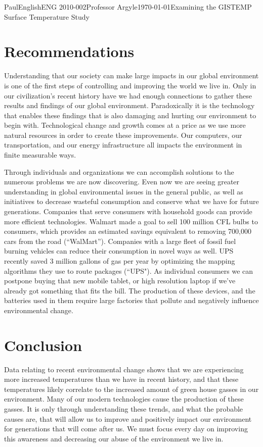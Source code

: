 \documentclass[12pt,letterpaper]{article}
\begin{document}
\begin{mla}{Paul}{English}{ENG 2010-002}{Professor Argyle}{\today}{Examining the GISTEMP Surface Temperature Study}
\section{Recommendations}

Understanding that our society can make large impacts in our global environment is one of the first steps of controlling and improving the world we live in. Only in our civilization's recent history have we had enough connections to gather these results and findings of our global environment. Paradoxically it is the technology that enables these findings that is also damaging and hurting our environment to begin with. Technological change and growth comes at a price as we use more natural resources in order to create these improvements. Our computers, our transportation, and our energy infrastructure all impacts the environment in finite measurable ways.

Through individuals and organizations we can accomplish solutions to the numerous problems we are now discovering. Even now we are seeing greater understanding in global environmental issues in the general public, as well as initiatives to decrease wasteful consumption and conserve what we have for future generations. Companies that serve consumers with household goods can provide more efficient technologies. Walmart made a goal to sell 100 million CFL bulbs to consumers, which provides an estimated savings equivalent to removing 700,000 cars from the road (``WalMart''). Companies with a large fleet of fossil fuel burning vehicles can reduce their consumption in novel ways as well. UPS recently saved 3 million gallons of gas per year by optimizing the mapping algorithms they use to route packages (``UPS"). As individual consumers we can postpone buying that new mobile tablet, or high resolution laptop if we've already got something that fits the bill. The production of these devices, and the batteries used in them require large factories that pollute and negatively influence environmental change.

\section{Conclusion}
Data relating to recent environmental change shows that we are experiencing more increased temperatures than we have in recent history, and that these temperatures likely correlate to the increased amount of green house gasses in our environment. Many of our modern technologies cause the production of these gasses. It is only through understanding these trends, and what the probable causes are, that will allow us to improve and positively impact our environment for generations that will come after us. We must focus every day on improving this awareness and decreasing our abuse of the environment we live in.


\end{mla}
\end{document}

